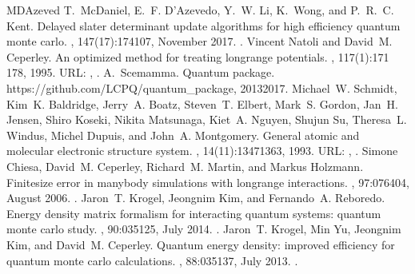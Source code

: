 \documentclass[letterpaper,10pt,english]{sphinxmanual}
\begin{document}
\begin{sphinxthebibliography}{MDAzeved}
T. McDaniel, E. F. D’Azevedo, Y. W. Li, K. Wong, and P. R. C. Kent. Delayed slater determinant update algorithms for high efficiency quantum monte carlo. , 147(17):174107, November 2017. .
Vincent Natoli and David M. Ceperley. An optimized method for treating long\sphinxhyphen{}range potentials. , 117(1):171 \textendash{} 178, 1995. URL: , .
A. Scemamma. Quantum package. https://github.com/LCPQ/quantum\_package, 2013\textendash{}2017.
Michael W. Schmidt, Kim K. Baldridge, Jerry A. Boatz, Steven T. Elbert, Mark S. Gordon, Jan H. Jensen, Shiro Koseki, Nikita Matsunaga, Kiet A. Nguyen, Shujun Su, Theresa L. Windus, Michel Dupuis, and John A. Montgomery. General atomic and molecular electronic structure system. , 14(11):1347\textendash{}1363, 1993. URL: , .
Simone Chiesa, David M. Ceperley, Richard M. Martin, and Markus Holzmann. Finite\sphinxhyphen{}size error in many\sphinxhyphen{}body simulations with long\sphinxhyphen{}range interactions. , 97:076404, August 2006. .
Jaron T. Krogel, Jeongnim Kim, and Fernando A. Reboredo. Energy density matrix formalism for interacting quantum systems: quantum monte carlo study. , 90:035125, July 2014. .
Jaron T. Krogel, Min Yu, Jeongnim Kim, and David M. Ceperley. Quantum energy density: improved efficiency for quantum monte carlo calculations. , 88:035137, July 2013. .

\end{sphinxthebibliography}
\end{document}
